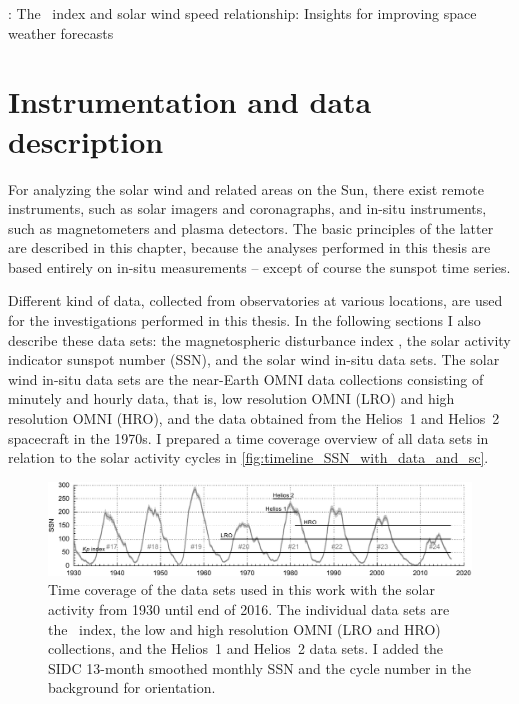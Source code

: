 \citet{Elliott2013}: The \Kp~index and solar wind speed relationship: Insights for improving space weather forecasts\\




\chapter{Instrumentation and data description}
\label{chap:data}
For analyzing the solar wind and related areas on the Sun, there exist remote instruments, such as solar imagers and coronagraphs, and in-situ instruments, such as magnetometers and plasma detectors. The basic principles of the latter are described in this chapter, because the analyses performed in this thesis are based entirely on in-situ measurements -- except of course the sunspot time series.

Different kind of data, collected from observatories at various locations, are used for the investigations performed in this thesis. In the following sections I also describe these data sets: the magnetospheric disturbance index \Kp{}, the solar activity indicator sunspot number (SSN), and the solar wind in-situ data sets. The solar wind in-situ data sets are the near-Earth OMNI data collections consisting of minutely and hourly data, that is, low resolution OMNI (LRO) and high resolution OMNI (HRO), and the data obtained from the Helios~1 and Helios~2 spacecraft in the 1970s. I prepared a time coverage overview of all data sets in relation to the solar activity cycles in \autoref{fig:timeline_SSN_with_data_and_sc}.\\
\begin{figure}[htb]
	\centering
	\includegraphics[width=\textwidth]{figures_of_mine/gnuplots/timeline_SSN_with_data_and_sc.pdf}
	\caption[]
	{Time coverage of the data sets used in this work with the solar activity from 1930 until end of 2016. The individual data sets are the \Kp~index, the low and high resolution OMNI (LRO and HRO) collections, and the Helios~1 and Helios~2 data sets. I added the SIDC 13-month smoothed monthly SSN and the cycle number in the background for orientation.}
	\label{fig:timeline_SSN_with_data_and_sc}
\end{figure}

